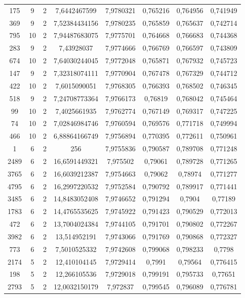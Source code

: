 \begin{longtable}{|c|c|c|c|c|c|c|c|}
175 & 9 & 2 & 7,6442467599 & 7,9780321 & 0,765216 & 0,764956 & 0,741949 \\
369 & 9 & 2 & 7,52384434156 & 7,9780235 & 0,765859 & 0,765637 & 0,742714 \\
795 & 10 & 2 & 7,94487683075 & 7,9775701 & 0,764668 & 0,766683 & 0,744368 \\
283 & 9 & 2 & 7,43928037 & 7,9774666 & 0,766769 & 0,766597 & 0,743809 \\
674 & 10 & 2 & 7,64030244045 & 7,9772048 & 0,765871 & 0,767932 & 0,745723 \\
147 & 9 & 2 & 7,32318074111 & 7,9770904 & 0,767478 & 0,767329 & 0,744712 \\
422 & 10 & 2 & 7,6015090051 & 7,9768305 & 0,766393 & 0,768502 & 0,746345 \\
518 & 9 & 2 & 7,24708773364 & 7,9766173 & 0,76819 & 0,768042 & 0,745464 \\
99 & 10 & 2 & 7,4025661935 & 7,9762774 & 0,767149 & 0,769317 & 0,747225 \\
74 & 10 & 2 & 7,02846984746 & 7,9760594 & 0,769576 & 0,771718 & 0,749994 \\
466 & 10 & 2 & 6,88864166749 & 7,9756894 & 0,770395 & 0,772611 & 0,750961 \\
1 & 6 & 2 & 256 & 7,9755836 & 0,790587 & 0,789708 & 0,771248 \\
2489 & 6 & 2 & 16,6591449321 & 7,975502 & 0,79061 & 0,789728 & 0,771265 \\
3765 & 6 & 2 & 16,6039212387 & 7,9754663 & 0,79062 & 0,78974 & 0,771277 \\
4795 & 6 & 2 & 16,2997220532 & 7,9752584 & 0,790792 & 0,789917 & 0,771441 \\
3485 & 6 & 2 & 14,8483052408 & 7,9746652 & 0,791294 & 0,7904 & 0,77189 \\
1783 & 6 & 2 & 14,4765535625 & 7,9745922 & 0,791423 & 0,790529 & 0,772013 \\
472 & 6 & 2 & 13,7004024384 & 7,9744105 & 0,791701 & 0,790802 & 0,772267 \\
3982 & 6 & 2 & 13,514952191 & 7,9743066 & 0,791769 & 0,790868 & 0,772327 \\
773 & 6 & 2 & 7,5010525332 & 7,9742608 & 0,799068 & 0,798233 & 0,7798 \\
2174 & 5 & 2 & 12,410104145 & 7,9729414 & 0,7991 & 0,79564 & 0,776415 \\
198 & 5 & 2 & 12,266105536 & 7,9729018 & 0,799191 & 0,795733 & 0,77651 \\
2793 & 5 & 2 & 12,0032150179 & 7,972837 & 0,799545 & 0,796089 & 0,776781 \\

\end{longtable}
